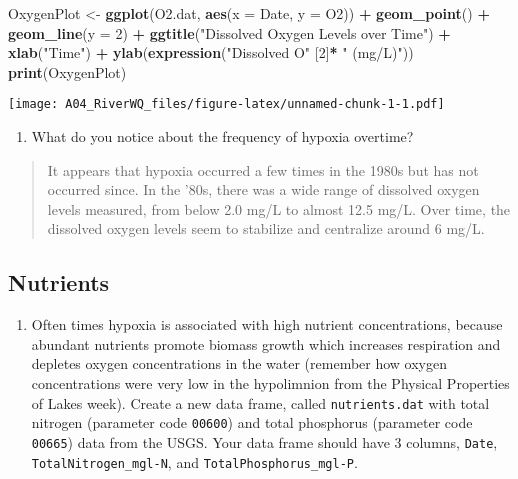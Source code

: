 \documentclass[]{article}
\newenvironment{Shaded}{\begin{snugshade}}{\end{snugshade}}
\newcommand{\DataTypeTok}[1]{\textcolor[rgb]{0.13,0.29,0.53}{#1}}
\newcommand{\DecValTok}[1]{\textcolor[rgb]{0.00,0.00,0.81}{#1}}
\newcommand{\KeywordTok}[1]{\textcolor[rgb]{0.13,0.29,0.53}{\textbf{#1}}}
\newcommand{\NormalTok}[1]{#1}
\newcommand{\OperatorTok}[1]{\textcolor[rgb]{0.81,0.36,0.00}{\textbf{#1}}}
\newcommand{\StringTok}[1]{\textcolor[rgb]{0.31,0.60,0.02}{#1}}
\providecommand{\tightlist}{%
  \setlength{\itemsep}{0pt}\setlength{\parskip}{0pt}}
\begin{document}
\begin{Shaded}
\begin{Highlighting}[]
\NormalTok{OxygenPlot <-}
\StringTok{  }\KeywordTok{ggplot}\NormalTok{(O2.dat, }\KeywordTok{aes}\NormalTok{(}\DataTypeTok{x =}\NormalTok{ Date, }\DataTypeTok{y =}\NormalTok{ O2)) }\OperatorTok{+}
\StringTok{  }\KeywordTok{geom_point}\NormalTok{() }\OperatorTok{+}
\StringTok{  }\KeywordTok{geom_line}\NormalTok{(}\DataTypeTok{y =} \DecValTok{2}\NormalTok{) }\OperatorTok{+}
\StringTok{  }\KeywordTok{ggtitle}\NormalTok{(}\StringTok{"Dissolved Oxygen Levels over Time"}\NormalTok{) }\OperatorTok{+}
\StringTok{  }\KeywordTok{xlab}\NormalTok{(}\StringTok{"Time"}\NormalTok{) }\OperatorTok{+}
\StringTok{  }\KeywordTok{ylab}\NormalTok{(}\KeywordTok{expression}\NormalTok{(}\StringTok{"Dissolved O"}\NormalTok{ [}\DecValTok{2}\NormalTok{]}\OperatorTok{*}\StringTok{ " (mg/L)"}\NormalTok{))}
\KeywordTok{print}\NormalTok{(OxygenPlot)}
\end{Highlighting}
\end{Shaded}

\texttt{[image: A04\_RiverWQ\_files/figure-latex/unnamed-chunk-1-1.pdf]}

\begin{enumerate}
\def\labelenumi{\arabic{enumi}.}
\setcounter{enumi}{5}
\tightlist
\item
  What do you notice about the frequency of hypoxia overtime?
\end{enumerate}

\begin{quote}
It appears that hypoxia occurred a few times in the 1980s but has not
occurred since. In the '80s, there was a wide range of dissolved oxygen
levels measured, from below 2.0 mg/L to almost 12.5 mg/L. Over time, the
dissolved oxygen levels seem to stabilize and centralize around 6 mg/L.
\end{quote}

\hypertarget{nutrients}{%
\subsection{Nutrients}\label{nutrients}}

\begin{enumerate}
\def\labelenumi{\arabic{enumi}.}
\setcounter{enumi}{6}
\tightlist
\item
  Often times hypoxia is associated with high nutrient concentrations,
  because abundant nutrients promote biomass growth which increases
  respiration and depletes oxygen concentrations in the water (remember
  how oxygen concentrations were very low in the hypolimnion from the
  Physical Properties of Lakes week). Create a new data frame, called
  \texttt{nutrients.dat} with total nitrogen (parameter code
  \texttt{00600}) and total phosphorus (parameter code \texttt{00665})
  data from the USGS. Your data frame should have 3 columns,
  \texttt{Date}, \texttt{TotalNitrogen\_mgl-N}, and
  \texttt{TotalPhosphorus\_mgl-P}.
\end{enumerate}
\end{document}

